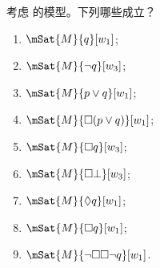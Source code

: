 \documentclass[../../../include/open-logic-section]{subfiles}
\begin{document}
\begin{prob}
  考虑  的模型。下列哪些成立？
    \begin{enumerate}
    \item $\mSat{M}{q}[w_1]$;
    \item $\mSat{M}{\lnot q}[w_3]$;
    \item $\mSat{M}{p \lor q}[w_1]$;
    \item $\mSat{M}{\Box (p \lor q)}[w_1]$;
    \item $\mSat{M}{\Box q}[w_3]$;
    \item $\mSat{M}{\Box \bot}[w_3]$;
    \item $\mSat{M}{\Diamond q}[w_1]$;
    \item $\mSat{M}{\Box q}[w_1]$;
    \item $\mSat{M}{\lnot \Box\Box \lnot q}[w_1]$.
    \end{enumerate}
\end{prob}
\end{document}

